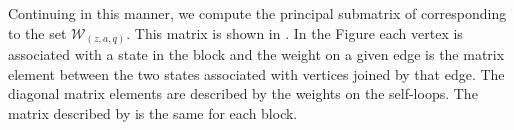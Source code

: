 \documentclass[../thesis-main/thesis-main]{subfiles}
\begin{document}
\begin{comment}
Similarly, we have
\begin{align*}
&\langle\psi_{z,a}^{d(q,1)}|h_{\mathcal{E}^{\triangle}}|\psi_{z,a}^{d(q,1)}\rangle
\\&\quad=\langle\psi_{z,a}^{d(q,1)}|\Bigg(\sum_{(z',t,t^{\prime})\in\{(0,7,3),(1,5,1)\}}\left(|q_{\text{in}},z',t\rangle+|d(q,1),z',t^{\prime}\rangle\right)\left(\langle q_{\text{in}},z',t|+\langle d(q,1),z',t^{\prime}|\right)\otimes\II
+\text{3 terms from other neighbors}\Bigg)|\psi_{z,a}^{d(q,1)}\rangle\\ & \quad
=\sum_{(z',t^{\prime})\in\{(0,3),(1,1)\}}\langle\psi_{z,a}|\left(|z',t^{\prime}\rangle\langle z',t^{\prime}|\otimes\II\right)|\psi_{z,a}\rangle
+\text{3 similar terms}
=\frac{1}{2}.
\end{align*}
\end{comment}
Continuing in this manner, we compute the principal submatrix of  corresponding to the set $\mathcal{W}_{(z,a,q)}$. This matrix is shown in . In the Figure each vertex is associated with a state in the block and the weight on a given edge is the matrix element between the two states associated with vertices joined by that edge. The diagonal matrix elements are described by the weights on the self-loops. The matrix described by  is the same for each block.
\end{document}
